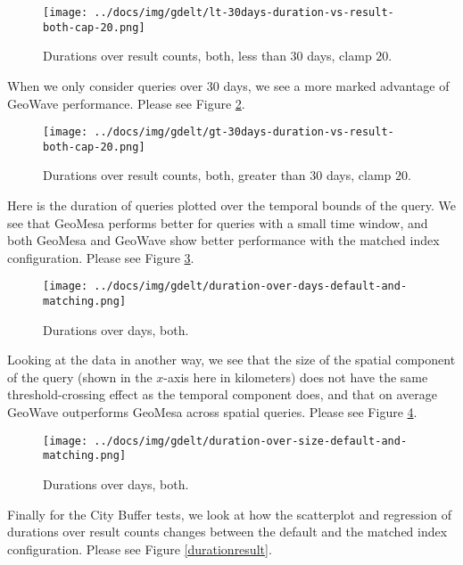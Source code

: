 \begin{figure}[h!tb]
  \centering
  \texttt{[image: ../docs/img/gdelt/lt-30days-duration-vs-result-both-cap-20.png]}
  \caption{Durations over result counts, both, less than $30$ days, clamp $20$.}
  \label{matchinglt3020}
\end{figure}

When we only consider queries over 30 days, we see a more marked advantage of GeoWave performance.
Please see Figure \ref{matchinggt3020}.

\begin{figure}[h!tb]
  \centering
  \texttt{[image: ../docs/img/gdelt/gt-30days-duration-vs-result-both-cap-20.png]}
  \caption{Durations over result counts, both, greater than $30$ days, clamp $20$.}
  \label{matchinggt3020}
\end{figure}


Here is the duration of queries plotted over the temporal bounds of the query.
We see that GeoMesa performs better for queries with a small time window,
and both GeoMesa and GeoWave show better performance with the matched index configuration.
Please see Figure \ref{durationdaysboth}.

\begin{figure}[h!tb]
  \centering
  \texttt{[image: ../docs/img/gdelt/duration-over-days-default-and-matching.png]}
  \caption{Durations over days, both.}
  \label{durationdaysboth}
\end{figure}

Looking at the data in another way, we see that the size of the spatial component of the query
(shown in the $x$-axis here in kilometers)
does not have the same threshold-crossing effect as the temporal component does,
and that on average GeoWave outperforms GeoMesa across spatial queries.
Please see Figure \ref{durationsize}.

\begin{figure}[h!tb]
  \centering
  \texttt{[image: ../docs/img/gdelt/duration-over-size-default-and-matching.png]}
  \caption{Durations over days, both.}
  \label{durationsize}
\end{figure}

Finally for the City Buffer tests, we look at how the scatterplot and regression
of durations over result counts changes between the default and the matched index configuration.
Please see Figure \ref{durationresult}.

